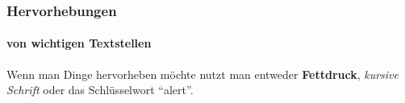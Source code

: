 \begin{frame}
    \frametitle{Hervorhebungen}
    \framesubtitle{von wichtigen Textstellen}

    Wenn man Dinge hervorheben m\"ochte nutzt man entweder \textbf{Fettdruck},
    \textit{ kursive Schrift} \alert{ oder das Schl\"usselwort ``alert''}.
\end{frame}
